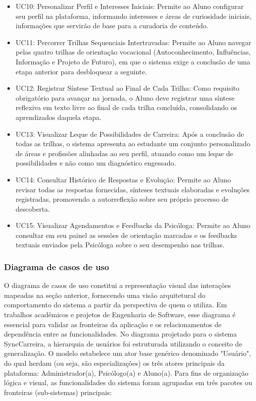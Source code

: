 \vspace{\baselineskip}
\vspace{-0.5\baselineskip}
\begin{itemize}
    \item UC10: Personalizar Perfil e Interesses Iniciais: Permite ao Aluno configurar seu perfil na plataforma, informando interesses e áreas de curiosidade iniciais, informações que servirão de base para a curadoria de conteúdo.
    \item UC11: Percorrer Trilhas Sequenciais Intertravadas: Permite ao Aluno navegar pelas quatro trilhas de orientação vocacional (Autoconhecimento, Influências, Informação e Projeto de Futuro), em que o sistema exige a conclusão de uma etapa anterior para desbloquear a seguinte.
    \item UC12: Registrar Síntese Textual ao Final de Cada Trilha: Como requisito obrigatório para avançar na jornada, o Aluno deve registrar uma síntese reflexiva em texto livre ao final de cada trilha concluída, consolidando os aprendizados daquela etapa.
    \item UC13: Visualizar Leque de Possibilidades de Carreira: Após a conclusão de todas as trilhas, o sistema apresenta ao estudante um conjunto personalizado de áreas e profissões alinhadas ao seu perfil, atuando como um leque de possibilidades e não como um diagnóstico engessado.
    \item UC14: Consultar Histórico de Respostas e Evolução: Permite ao Aluno revisar todas as respostas fornecidas, sínteses textuais elaboradas e evoluções registradas, promovendo a autorreflexão sobre seu próprio processo de descoberta.
    \item UC15: Visualizar Agendamentos e Feedbacks da Psicóloga: Permite ao Aluno consultar em seu painel as sessões de orientação marcadas e os feedbacks textuais enviados pela Psicóloga sobre o seu desempenho nas trilhas.
\end{itemize}

\subsubsection{Diagrama de casos de uso}

O diagrama de casos de uso constitui a representação visual das interações mapeadas na seção anterior, fornecendo uma visão arquitetural do comportamento do sistema a partir da perspectiva de quem o utiliza. Em trabalhos acadêmicos e projetos de Engenharia de Software, esse diagrama é essencial para validar as fronteiras da aplicação e os relacionamentos de dependência entre as funcionalidades.
No diagrama projetado para o sistema SyncCarreira, a hierarquia de usuários foi estruturada utilizando o conceito de generalização. O modelo estabelece um ator base genérico denominado "Usuário", do qual herdam (ou seja, são especializações) os três atores principais da plataforma: Administrador(a), Psicólogo(a) e Aluno(a).
Para fins de organização lógica e visual, as funcionalidades do sistema foram agrupadas em três pacotes ou fronteiras (sub-sistemas) principais:

